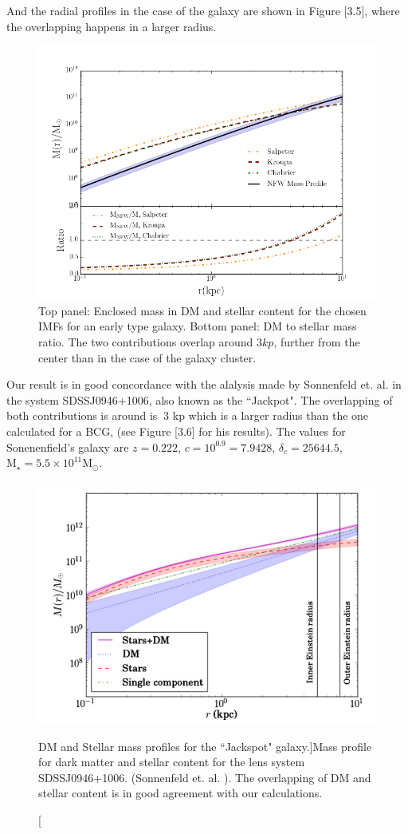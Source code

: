 And the radial profiles in the case of the galaxy are shown in Figure [3.5], where the overlapping happens in a larger radius.

\begin{figure}[H]
\centering
\includegraphics[width=12cm]{images/DM_fraction_all_IMFs_galaxy.png}
\caption[DM and Stellar mass profiles for a massive early type galaxy.]{Top panel: Enclosed mass in DM and stellar content for the chosen IMFs for an early type galaxy. Bottom panel: DM to stellar mass ratio. The two contributions overlap around $3 kp$, further from the center than in the case of the galaxy cluster.}
\end{figure}

Our result is in good concordance with the alalysis made by Sonnenfeld et. al. \citeyear{Reference15} in the system SDSSJ0946+1006, also known as the ``Jackpot". The overlapping of both contributions is around is $~3$ kp which is a larger radius than the one calculated for a BCG, (see Figure [3.6] for his results). The values for Sonenenfield's galaxy are $z=0.222$, $c=10^{0.9}=7.9428$, $\delta_c=25644.5$, $\text{M}_{\star}=5.5\times 10^{11} \text{M}_{\odot}$.

\begin{figure}[H]
\centering
\includegraphics[width=12cm]{images/sonnenfeld_galaxy.png}
\caption[DM and Stellar mass profiles for the ``Jackspot" galaxy.]{Mass profile for dark matter and stellar content for the lens system SDSSJ0946+1006. (Sonnenfeld et. al. \citeyear{Reference15}). The overlapping of DM and stellar content is in good agreement with our calculations.}
\end{figure}

